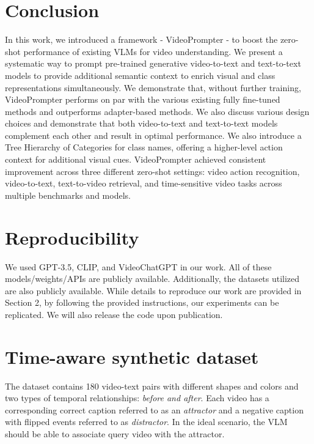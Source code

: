 \documentclass{article} \usepackage{iclr2024_conference,times}
\begin{document}
\section{Conclusion}
In this work, we introduced a framework - VideoPrompter -  to boost the zero-shot performance of existing VLMs for video understanding. We present a systematic way to prompt pre-trained generative video-to-text and text-to-text models to provide additional semantic context to enrich visual and class representations simultaneously. We demonstrate that, without further training, VideoPrompter performs on par with the various existing fully fine-tuned methods and outperforms adapter-based methods.  We also discuss various design choices and demonstrate that both video-to-text and text-to-text models complement each other and result in optimal performance. We also introduce a Tree Hierarchy of Categories for class names, offering a higher-level action context for additional visual cues. VideoPrompter achieved consistent improvement across three different zero-shot settings: video action recognition, video-to-text, text-to-video retrieval, and time-sensitive video tasks across multiple benchmarks and models.








\section*{Reproducibility}
We used GPT-3.5, CLIP, and VideoChatGPT in our work. All of these models/weights/APIs are publicly available. Additionally, the datasets utilized are also publicly available.  While details to reproduce our work are provided in Section 2, by following the provided instructions, our experiments can be replicated. We will also release the code upon publication.





\newpage

\appendix
\section{Time-aware synthetic dataset}
\label{Time-aware synthetic dataset}
The dataset \citep{bagad2023test} contains 180 video-text pairs with different shapes and colors and two types of temporal relationships: \emph{before and after}. Each video has a corresponding correct caption referred to as an \emph{attractor} and a negative caption with flipped events referred to as \emph{distractor}. In the ideal scenario, the VLM should be able to associate query video with the attractor. 
\end{document}
